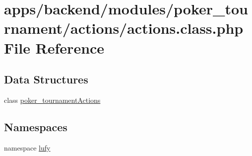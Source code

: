 \hypertarget{backend_2modules_2poker__tournament_2actions_2actions_8class_8php}{\section{apps/backend/modules/poker\-\_\-tournament/actions/actions.class.\-php File Reference}
\label{backend_2modules_2poker__tournament_2actions_2actions_8class_8php}
}
\subsection*{Data Structures}
\begin{DoxyCompactItemize}
\item 
class \hyperlink{classpoker__tournament_actions}{poker\-\_\-tournament\-Actions}
\end{DoxyCompactItemize}
\subsection*{Namespaces}
\begin{DoxyCompactItemize}
\item 
namespace \hyperlink{namespacelufy}{lufy}
\end{DoxyCompactItemize}
